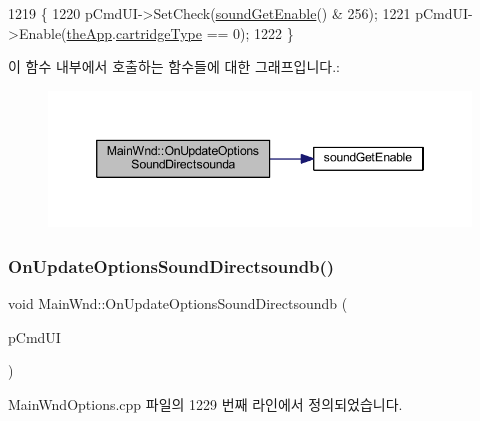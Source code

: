 \begin{DoxyCode}
1219 \{
1220   pCmdUI->SetCheck(\mbox{\hyperlink{_sound_8cpp_a3d1f6129176583804274bb162c3428a8}{soundGetEnable}}() & 256);
1221   pCmdUI->Enable(\mbox{\hyperlink{_v_b_a_8cpp_a8095a9d06b37a7efe3723f3218ad8fb3}{theApp}}.\mbox{\hyperlink{class_v_b_a_af300759fcbc7eeb00ce73f956fc5ddb7}{cartridgeType}} == 0);
1222 \}
\end{DoxyCode}
이 함수 내부에서 호출하는 함수들에 대한 그래프입니다.\+:
\nopagebreak
\begin{figure}[H]
\begin{center}
\leavevmode
\includegraphics[width=346pt]{class_main_wnd_a47d8a1f6079e54d268ff2a19a34aba6e_cgraph}
\end{center}
\end{figure}
\mbox{\label{class_main_wnd_aa1b7a906630cf65b6a41c416eaecf3c3}} 
\subsubsection{\texorpdfstring{On\+Update\+Options\+Sound\+Directsoundb()}{OnUpdateOptionsSoundDirectsoundb()}}
{\footnotesize\ttfamily void Main\+Wnd\+::\+On\+Update\+Options\+Sound\+Directsoundb (\begin{DoxyParamCaption}\item[{C\+Cmd\+UI $\ast$}]{p\+Cmd\+UI }\end{DoxyParamCaption})\hspace{0.3cm}{\ttfamily [protected]}}



Main\+Wnd\+Options.\+cpp 파일의 1229 번째 라인에서 정의되었습니다.


